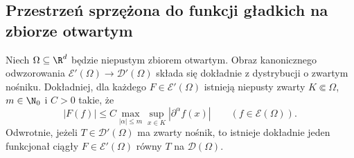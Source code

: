 \subsection{Przestrzeń sprzężona do funkcji gładkich na zbiorze otwartym}
\begin{twierdzenie}
\label{thm:compact-support-E25}
Niech $\Omega\subseteq\R^d$ będzie niepustym zbiorem otwartym.
Obraz kanonicznego odwzorowania
$\mathcal E'(\Omega)\to\mathcal D'(\Omega)$
składa się dokładnie z dystrybucji o zwartym nośniku.
Dokładniej, dla każdego $F\in\mathcal E'(\Omega)$ istnieją
niepusty zwarty $K\Subset\Omega$, $m\in\N_0$ i $C>0$ takie, że
\[
 |F(f)|\le C\max_{|\alpha|\le m}\sup_{x\in K}
 |\partial^\alpha f(x)|\qquad(f\in\mathcal E(\Omega)).
\]
Odwrotnie, jeżeli $T\in\mathcal D'(\Omega)$ ma zwarty nośnik,
to istnieje dokładnie jeden funkcjonał ciągły
$F\in\mathcal E'(\Omega)$ równy $T$ na $\mathcal D(\Omega)$.
\end{twierdzenie}
